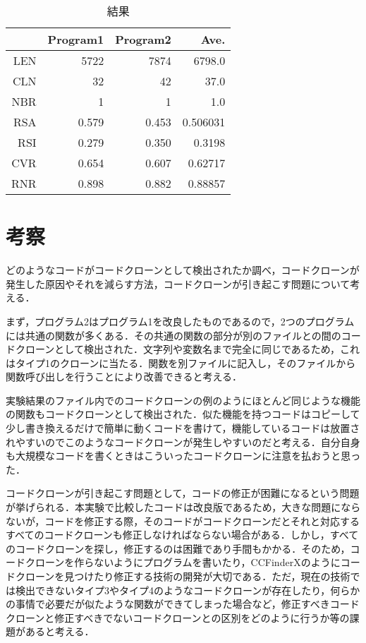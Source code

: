 \documentclass[11pt]{jarticle}
\begin{document}
\begin{table}[htb]
\begin{center}
\caption{結果}
\begin{tabular}{|r||r|r|r|}
\hline
& Program1 & Program2 & Ave. \\
\hline \hline
LEN & 5722 & 7874 & 6798.0 \\
\hline
CLN & 32 & 42 & 37.0 \\
\hline
NBR & 1 & 1 & 1.0 \\
\hline
RSA & 0.579 & 0.453 & 0.506031 \\
\hline
RSI & 0.279 & 0.350 & 0.3198 \\
\hline
CVR & 0.654 & 0.607 & 0.62717 \\
\hline
RNR & 0.898 & 0.882 & 0.88857\\
\hline
\end{tabular}
\end{center}
\end{table}


\section{考察}
どのようなコードがコードクローンとして検出されたか調べ，コードクローンが発生した原因やそれを減らす方法，コードクローンが引き起こす問題について考える．

まず，プログラム2はプログラム1を改良したものであるので，2つのプログラムには共通の関数が多くある．その共通の関数の部分が別のファイルとの間のコードクローンとして検出された．文字列や変数名まで完全に同じであるため，これはタイプ1のクローンに当たる．関数を別ファイルに記入し，そのファイルから関数呼び出しを行うことにより改善できると考える．

実験結果のファイル内でのコードクローンの例のようにほとんど同じような機能の関数もコードクローンとして検出された．似た機能を持つコードはコピーして少し書き換えるだけで簡単に動くコードを書けて，機能しているコードは放置されやすいのでこのようなコードクローンが発生しやすいのだと考える．自分自身も大規模なコードを書くときはこういったコードクローンに注意を払おうと思った．

コードクローンが引き起こす問題として，コードの修正が困難になるという問題が挙げられる．本実験で比較したコードは改良版であるため，大きな問題にならないが，コードを修正する際，そのコードがコードクローンだとそれと対応するすべてのコードクローンも修正しなければならない場合がある．しかし，すべてのコードクローンを探し，修正するのは困難であり手間もかかる．そのため，コードクローンを作らないようにプログラムを書いたり，CCFinderXのようにコードクローンを見つけたり修正する技術の開発が大切である．ただ，現在の技術では検出できないタイプ3やタイプ4のようなコードクローンが存在したり，何らかの事情で必要だが似たような関数ができてしまった場合など，修正すべきコードクローンと修正すべきでないコードクローンとの区別をどのように行うか等の課題があると考える．
\end{document}
